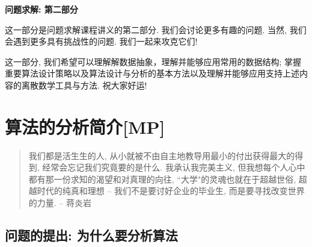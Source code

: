 \begin{center}
\textbf{问题求解: 第二部分}	
\end{center}

这一部分是问题求解课程讲义的第二部分. 我们会讨论更多有趣的问题. 当然, 我们会遇到更多具有挑战性的问题. 我们一起来攻克它们!

这一部分, 我们希望可以理解解数据抽象，理解并能够应用常用的数据结构; 掌握重要算法设计策略以及算法设计与分析的基本方法以及理解并能够应用支持上述内容的离散数学工具与方法. 祝大家好运! 

\chapter{算法的分析简介[MP]}
\begin{quote}
	我们都是活生生的人, 从小就被不由自主地教导用最小的付出获得最大的得到, 经常会忘记我们究竟要的是什么. 我承认我完美主义, 但我想每个人心中都有那一份求知的渴望和对真理的向往, ``大学"的灵魂也就在于超越世俗, 超越时代的纯真和理想 -- 我们不是要讨好企业的毕业生, 而是要寻找改变世界的力量. \hfill -- 蒋炎岩
\end{quote}

\section{问题的提出: 为什么要分析算法}



